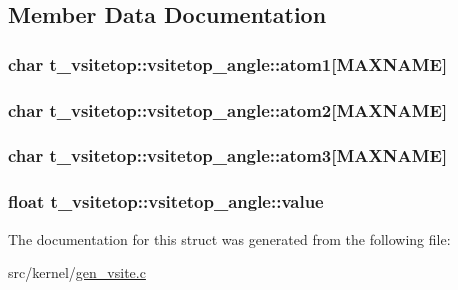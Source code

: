 \subsection{\-Member \-Data \-Documentation}
\hypertarget{structt__vsitetop_1_1vsitetop__angle_aa266fb535de5f7103d5c908dcf2a004d}{
\subsubsection[{atom1}]{\setlength{\rightskip}{0pt plus 5cm}char {\bf t\-\_\-vsitetop\-::vsitetop\-\_\-angle\-::atom1}\mbox{[}{\bf \-M\-A\-X\-N\-A\-M\-E}\mbox{]}}}\label{structt__vsitetop_1_1vsitetop__angle_aa266fb535de5f7103d5c908dcf2a004d}
\hypertarget{structt__vsitetop_1_1vsitetop__angle_a005219e34f638294a3e2842bedcc8746}{
\subsubsection[{atom2}]{\setlength{\rightskip}{0pt plus 5cm}char {\bf t\-\_\-vsitetop\-::vsitetop\-\_\-angle\-::atom2}\mbox{[}{\bf \-M\-A\-X\-N\-A\-M\-E}\mbox{]}}}\label{structt__vsitetop_1_1vsitetop__angle_a005219e34f638294a3e2842bedcc8746}
\hypertarget{structt__vsitetop_1_1vsitetop__angle_a1fc40ea70f5065575f82b929ff0656e2}{
\subsubsection[{atom3}]{\setlength{\rightskip}{0pt plus 5cm}char {\bf t\-\_\-vsitetop\-::vsitetop\-\_\-angle\-::atom3}\mbox{[}{\bf \-M\-A\-X\-N\-A\-M\-E}\mbox{]}}}\label{structt__vsitetop_1_1vsitetop__angle_a1fc40ea70f5065575f82b929ff0656e2}
\hypertarget{structt__vsitetop_1_1vsitetop__angle_a75e916300d66d8a27ad25d24498a1a6b}{
\subsubsection[{value}]{\setlength{\rightskip}{0pt plus 5cm}float {\bf t\-\_\-vsitetop\-::vsitetop\-\_\-angle\-::value}}}\label{structt__vsitetop_1_1vsitetop__angle_a75e916300d66d8a27ad25d24498a1a6b}


\-The documentation for this struct was generated from the following file\-:\begin{DoxyCompactItemize}
\item 
src/kernel/\hyperlink{gen__vsite_8c}{gen\-\_\-vsite.\-c}\end{DoxyCompactItemize}
